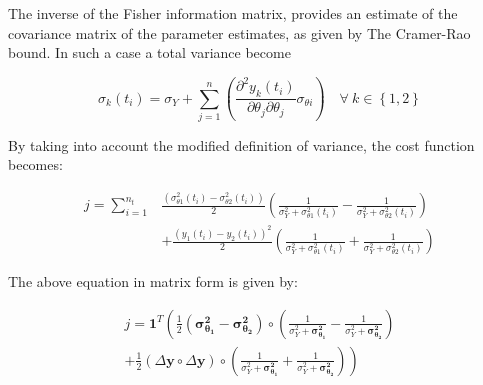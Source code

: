 \documentclass[../Article_Design_of_Experiment.tex]{subfiles}
\begin{document}
	The inverse of the Fisher information matrix, provides an estimate of the covariance matrix of the parameter estimates, as given by The Cramer-Rao bound. In such a case a total variance become
	
	{\footnotesize
	\begin{equation}
		\sigma_k(t_i) = \sigma_Y + \sum_{j=1}^{n} \left(\frac{\partial^2 y_k(t_i)}{\partial \theta_j \partial \theta_j} \sigma_{\theta i} \right) \quad \forall ~ k\in \left\{1,2\right\}
	\end{equation}
	}
	
	By taking into account the modified definition of variance, the cost function becomes:
	
	{\footnotesize
	\begin{align}
		j = \sum_{i=1}^{n_t} &\frac{\left(\sigma_{\theta 1}^2(t_i) - \sigma_{\theta 2}^2(t_i)\right)}{2}  \left( \frac{1}{\sigma_{Y}^2 + \sigma_{\theta 1}^2(t_i)} - \frac{1}{\sigma_{Y}^2 + \sigma_{\theta 2}^2(t_i)} \right) \nonumber \\
		&+ \frac{\left( y_1(t_i) - y_2(t_i) \right)^2}{2} \left( \frac{1}{\sigma_{Y}^2 + \sigma_{\theta 1}^2(t_i)} + \frac{1}{\sigma_{Y}^2 + \sigma_{\theta 2}^2(t_i)} \right)  
		\end{align}}
	
	The above equation in matrix form is given by:
	
	{\footnotesize
		\begin{equation}
			\begin{split}
				j = \mathbf{1}^T \left( \frac{1}{2} \left( \boldsymbol{\sigma_{\theta_1}^2} - \boldsymbol{\sigma_{\theta_2}^2} \right) \circ \left( \frac{1}{\sigma_Y^2 + \boldsymbol{\sigma_{\theta_1}^2}} - \frac{1}{\sigma_Y^2 + \boldsymbol{\sigma_{\theta_2}^2}} \right) \right. \\
				\left. + \frac{1}{2} \left( \Delta \mathbf{y} \circ \Delta \mathbf{y} \right) \circ \left( \frac{1}{\sigma_Y^2 + \boldsymbol{\sigma_{\theta_1}^2}} + \frac{1}{\sigma_Y^2 + \boldsymbol{\sigma_{\theta_2}^2}} \right) \right)
			\end{split}
		\end{equation}
	}
	
\end{document}
